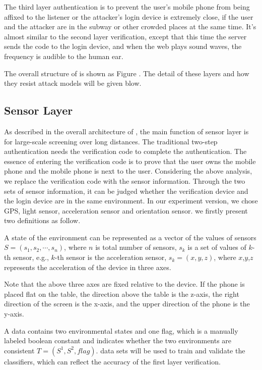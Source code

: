 The third layer authentication is to prevent the user's mobile phone from being affixed to the listener or the attacker's login device is extremely close, if the user and the attacker are in the subway or other crowded places at the same time. It's almost similar to the second layer verification, except that this time the server sends the code to the login device, and when the web plays sound waves, the frequency is audible to the human ear.




The overall structure of \Name is shown as Figure \uppercase\expandafter{}. The detail of these layers and how they resist attack models will be given blow.


\subsection{Sensor Layer}
As described in the overall architecture of \name, the main function of sensor layer is for large-scale screening over long distances. The traditional two-step authentication needs the verification code to complete the authentication. The essence of entering the verification code is to prove that the user owns the mobile phone and the mobile phone is next to the user. Considering the above analysis, we replace the verification code with the sensor information. Through the two sets of sensor information, it can be judged whether the verification device and the login device are in the same environment. In our experiment version, we chose GPS, light sensor, acceleration sensor and orientation sensor. we firstly present two definitions as follow.

\begin{definition}\label{def:enviroment state}
A state of the environment can be represented as a vector of the values of sensors $S=(s_1, s_2,\cdots,s_n)$, where $n$ is total number of sensors, $s_k$ is a set of values of $k$-th sensor, e.g., $k$-th sensor is the acceleration sensor,  $s_k=(x,y,z)$, where $x$,$y$,$z$ represents the acceleration of the device in three axes.
\end{definition}

Note that the above three axes are fixed relative to the device. If the phone is placed flat on the table, the direction above the table is the z-axis, the right direction of the screen is the x-axis, and the upper direction of the phone is the y-axis.

\begin{definition}\label{def:data}
A data contains two environmental states and one flag, which is a manually labeled boolean constant and indicates whether the two environments are consistent  $T=(S^1, S^2, flag)$. data sets will be used to train and validate the classifiers, which can reflect the accuracy of the first layer verification.
\end{definition}




